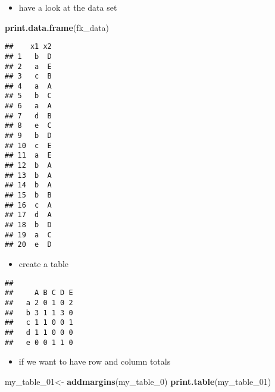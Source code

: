 \documentclass[]{article}
\newenvironment{Shaded}{\begin{snugshade}}{\end{snugshade}}
\newcommand{\DecValTok}[1]{\textcolor[rgb]{0.00,0.00,0.81}{#1}}
\newcommand{\KeywordTok}[1]{\textcolor[rgb]{0.13,0.29,0.53}{\textbf{#1}}}
\newcommand{\NormalTok}[1]{#1}
\newcommand{\OperatorTok}[1]{\textcolor[rgb]{0.81,0.36,0.00}{\textbf{#1}}}
\newcommand{\StringTok}[1]{\textcolor[rgb]{0.31,0.60,0.02}{#1}}
\providecommand{\tightlist}{%
  \setlength{\itemsep}{0pt}\setlength{\parskip}{0pt}}
\begin{document}
\begin{itemize}
\tightlist
\item
  have a look at the data set
\end{itemize}

\begin{Shaded}
\begin{Highlighting}[]
\KeywordTok{print.data.frame}\NormalTok{(fk_data)}
\end{Highlighting}
\end{Shaded}

\begin{verbatim}
##    x1 x2
## 1   b  D
## 2   a  E
## 3   c  B
## 4   a  A
## 5   b  C
## 6   a  A
## 7   d  B
## 8   e  C
## 9   b  D
## 10  c  E
## 11  a  E
## 12  b  A
## 13  b  A
## 14  b  A
## 15  b  B
## 16  c  A
## 17  d  A
## 18  b  D
## 19  a  C
## 20  e  D
\end{verbatim}

\begin{itemize}
\tightlist
\item
  create a table
\end{itemize}

\begin{Shaded}
\end{Shaded}

\begin{verbatim}
##    
##     A B C D E
##   a 2 0 1 0 2
##   b 3 1 1 3 0
##   c 1 1 0 0 1
##   d 1 1 0 0 0
##   e 0 0 1 1 0
\end{verbatim}

\begin{itemize}
\tightlist
\item
  if we want to have row and column totals
\end{itemize}

\begin{Shaded}
\begin{Highlighting}[]
\NormalTok{my_table_}\DecValTok{01}\NormalTok{<-}\StringTok{ }\KeywordTok{addmargins}\NormalTok{(my_table_}\DecValTok{0}\NormalTok{)}
\KeywordTok{print.table}\NormalTok{(my_table_}\DecValTok{01}\NormalTok{)}
\end{Highlighting}
\end{Shaded}
\end{document}

